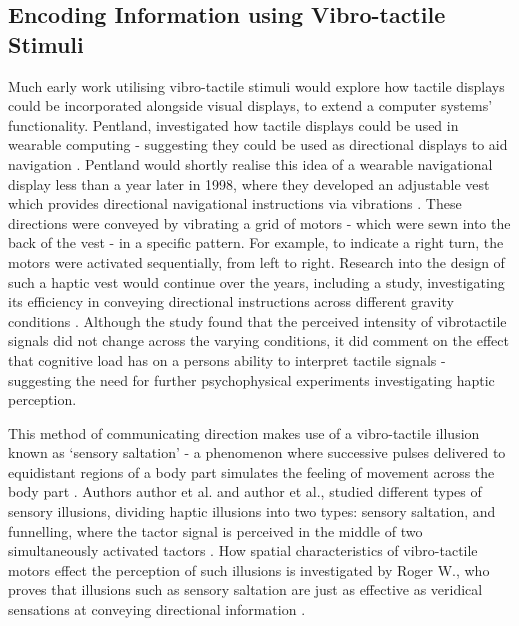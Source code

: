 \documentclass{interim}
\begin{document}
\subsection{Encoding Information using Vibro-tactile Stimuli}
Much early work utilising vibro-tactile stimuli would explore how tactile displays could be incorporated alongside visual displays, to extend a computer systems’ functionality. Pentland, investigated how tactile displays could be used in wearable computing - suggesting they could be used as directional displays to aid navigation \cite{629923}. Pentland would shortly realise this idea of a wearable navigational display less than a year later in 1998, where they developed an adjustable vest which provides directional navigational instructions via vibrations \cite{729547}. These directions were conveyed by vibrating a grid of motors - which were sewn into the back of the vest - in a specific pattern. For example, to indicate a right turn, the motors were activated sequentially, from left to right. Research into the design of such a haptic vest would continue over the years, including a study, investigating its efficiency in conveying directional instructions across different gravity conditions \cite{998954}. Although the study found that the perceived intensity of vibrotactile signals did not change across the varying conditions, it did comment on the effect that cognitive load has on a persons ability to interpret tactile signals - suggesting the need for further psychophysical experiments investigating haptic perception.

This method of communicating direction makes use of a vibro-tactile illusion known as ‘sensory saltation' - a phenomenon where successive pulses delivered to equidistant regions of a body part simulates the feeling of movement across the body part \cite{geldard1975sensory}. Authors author et al. and author et al., studied different types of sensory illusions, dividing haptic illusions into two types: sensory saltation, and funnelling, where the tactor signal is perceived in the middle of two simultaneously activated tactors \cite{5710913, s150407913}. How spatial characteristics of vibro-tactile motors effect the perception of such illusions is investigated by Roger W., who proves that illusions such as sensory saltation are just as effective as veridical sensations at conveying directional information \cite{cholewiak2000generation}.
\end{document}
